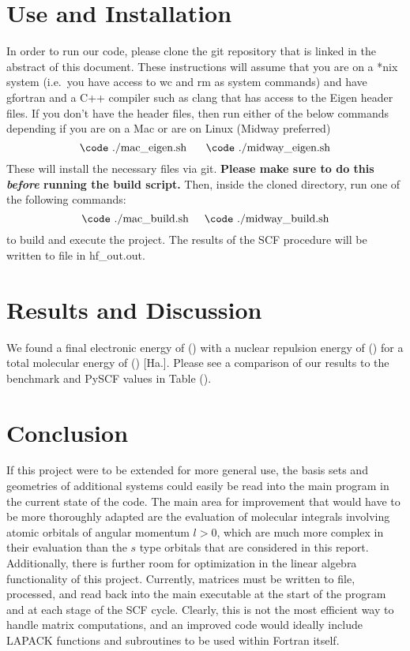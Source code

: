 \documentclass[%
 aip,
 amsmath,amssymb,
 reprint,%
]{revtex4-1}
\begin{document}
\section{Use and Installation}
In order to run our code, please clone the git repository that is linked in
the abstract of this document. These instructions will assume that you are
 on a *nix system (i.e.\ you have access to {\code wc} and {\code rm} as
 system commands) and have {\code gfortran} and a C++ compiler such as 
 {\code clang} that has access to the Eigen header files. If you don't
have the header files,  then run either of the below commands depending if you
are on a Mac or are on Linux (Midway preferred)
$$ \text{{\code ./mac\_eigen.sh} \hspace{0.5cm}{\code ./midway\_eigen.sh}}$$
These will install the necessary files via git.  \textbf{Please make sure to
do this \emph{before} running the build script.} Then, inside the cloned
directory, run one of the following commands: 
%
$$ \text{{\code ./mac\_build.sh}} \hspace{0.5cm}
 \text{{\code ./midway\_build.sh}} $$
to build and execute the project. The results of the SCF procedure will be
 written to file in {\code hf\_out.out}.

\section{Results and Discussion}
We found a final electronic energy of () with a nuclear repulsion energy of
() for a total molecular energy of () [Ha.]. Please see a comparison of our
results to the benchmark and PySCF values in Table (). 

\section{Conclusion}
If this project were to be extended for more general use, the basis sets and
geometries of additional systems could easily be read into the main program
in the current state of the code. The main area for improvement that would
have to be more thoroughly adapted are the evaluation of molecular integrals 
involving atomic orbitals of angular momentum $l > 0$, which are much more
complex in their evaluation than the $s$ type orbitals that are considered in
this report. Additionally, there is further room for optimization in the
linear algebra functionality of this project. Currently, matrices must be
written to file, processed, and read back into the main executable at the
start of the program and at each stage of the SCF cycle. Clearly, this is not
the most efficient way to handle matrix computations, and an improved code
would ideally include LAPACK functions and subroutines to be used within
Fortran itself.



\end{document}

